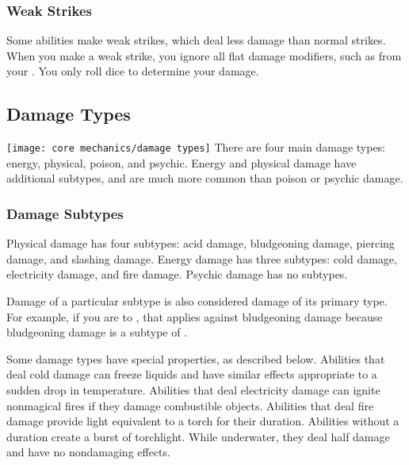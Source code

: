         \subsubsection{Weak Strikes}
            Some abilities make weak strikes, which deal less damage than normal strikes.
            When you make a weak strike, you ignore all flat damage modifiers, such as from your .
            You only roll dice to determine your damage.

    \subsection{Damage Types}\label{Damage Types}
        \texttt{[image: core mechanics/damage types]}
        There are four main damage types: energy, physical, poison, and psychic.
        Energy and physical damage have additional subtypes, and are much more common than poison or psychic damage.

        \subsubsection{Damage Subtypes}\label{Damage Subtypes}
            Physical damage has four subtypes: acid damage, bludgeoning damage, piercing damage, and slashing damage.
            Energy damage has three subtypes: cold damage, electricity damage, and fire damage.
            Psychic damage has no subtypes.

            Damage of a particular subtype is also considered damage of its primary type.
            For example, if you are  to , that applies against bludgeoning damage because bludgeoning damage is a subtype of .

            Some damage types have special properties, as described below.
             Abilities that deal cold damage can freeze liquids and have similar effects appropriate to a sudden drop in temperature.
             Abilities that deal electricity damage can ignite nonmagical fires if they damage combustible objects.
             Abilities that deal fire damage provide light equivalent to a torch for their duration.
            Abilities without a duration create a  burst of torchlight.
            While underwater, they deal half damage and have no nondamaging effects.

